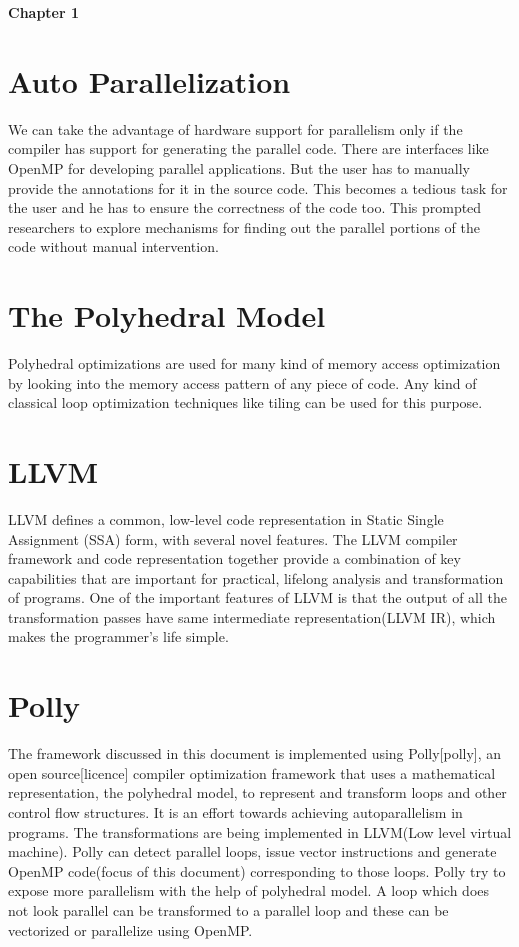 \documentclass[a4paper,12pt]{article}
\begin{document}
\begin{center}
{\bf {\LARGE Chapter 1}\linebreak{}}
\linebreak
\linebreak
\end{center}

\section{Auto Parallelization}

We can take the advantage of hardware support for parallelism only if the compiler has support for
generating the parallel code. There are interfaces like OpenMP for developing parallel applications.
But the user has to manually provide the annotations for it in the source code. This becomes
a tedious task for the user and he has to ensure the correctness of the code too.
This prompted researchers to explore mechanisms for finding out the parallel portions
of the code without manual intervention.

\section{The Polyhedral Model}

Polyhedral optimizations are used for many kind of memory access optimization by
looking into the memory access pattern of any piece of code. Any kind of classical
 loop optimization techniques like tiling can be used for this purpose. 



\section{LLVM}
LLVM defines a common, low-level code representation in Static Single Assignment
(SSA) form, with several novel features. The LLVM compiler framework and code
representation together provide a combination of key capabilities that are
important for practical, lifelong analysis and transformation of programs.
One of the important features of LLVM is that the output of all the
transformation passes have same intermediate representation(LLVM IR), which
makes the programmer’s life simple.

\section{Polly}
The framework discussed in this document is implemented using Polly[polly],
an open source[licence] compiler  optimization framework that uses a mathematical
 representation, the polyhedral model, to represent and transform loops and other
 control flow structures. It is an effort towards achieving autoparallelism in programs.
 The transformations are being implemented in LLVM(Low level virtual machine). 
Polly can detect parallel loops, issue vector instructions and generate OpenMP code(focus of 
this document) corresponding to those loops. Polly try to expose more parallelism
with the help of polyhedral model. A loop which does not look parallel can be transformed
to a parallel loop and these can be vectorized or parallelize using OpenMP.
\end{document}
